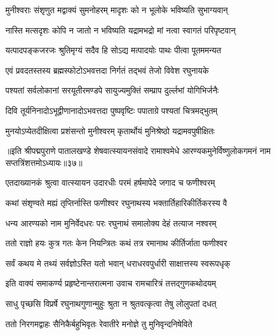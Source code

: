 \twolineshloka
{मुनीश्वराः संशृणुत मद्वाक्यं सुमनोहरम्}
{मादृशः को न भूलोके भविष्यति सुभाग्यवान्}%

\twolineshloka
{नास्ति मत्सदृशः कोपि न जातो न भविष्यति}
{यद्रामभद्रो मां नत्वा स्वागतं परिपृष्टवान्}%

\twolineshloka
{यत्पादपङ्कजरजः श्रुतिमृग्यं सदैव हि}
{सोऽद्य मत्पादयोः पाथः पीत्वा पूतममन्यत}%

\twolineshloka
{एवं प्रवदतस्तस्य ब्रह्मस्फोटोऽभवत्तदा}
{निर्गतं तद्भवं तेजो विवेश रघुनायके}%

\twolineshloka
{पश्यतां सर्वलोकानां सरयूतीरमण्डपे}
{सायुज्यमुक्तिं सम्प्राप दुर्ल्लभां योगिभिर्जनैः}%

\twolineshloka
{दिवि तूर्यनिनादोऽभूद्वीणानादोऽभवत्तदा}
{पुष्पवृष्टिः पपाताग्रे पश्यतां चित्रमद्भुतम्}%

\twolineshloka
{मुनयोऽप्येतदीक्षित्वा प्रशंसन्तो मुनीश्वरम्}
{कृतार्थोयं मुनिश्रेष्ठो यद्रामवपुषीक्षितः}%

{॥इति श्रीपद्मपुराणे पातालखण्डे शेषवात्स्यायनसंवादे रामाश्वमेधे आरण्यकमुनेर्विष्णुलोकगमनं नाम सप्तत्रिंशत्तमोऽध्यायः॥३७॥}



\twolineshloka
{एतदाख्यानकं श्रुत्वा वात्स्यायन उदारधीः}
{परमं हर्षमापेदे जगाद च फणीश्वरम्}%


\twolineshloka
{कथां संशृण्वते मह्यं तृप्तिर्नास्ति फणीश्वर}
{रघुनाथस्य भक्तार्तिहारिकीर्तिकरस्य वै}%

\twolineshloka
{धन्य आरण्यको नाम मुनिर्वेदधरः परः}
{रघुनाथं समालोक्य देहं तत्याज नश्वरम्}%

\twolineshloka
{ततो राज्ञो हयः कुत्र गतः केन नियन्त्रितः}
{कथं तत्र रमानाथ कीर्तिर्जाता फणीश्वर}%

\twolineshloka
{सर्वं कथय मे तथ्यं सर्वज्ञोऽस्ति यतो भवान्}
{धराधरवपुर्धारी साक्षात्तस्य स्वरूपधृक्}%


\twolineshloka
{इति वाक्यं समाकर्ण्य प्रहृष्टेनान्तरात्मना}
{उवाच रामचारित्रं तत्तद्गुणकथोदयम्}%


\twolineshloka
{साधु पृच्छसि विप्रर्षे रघुनाथगुणान्मुहुः}
{श्रुता न श्रुतवत्कृत्वा तेषु लोलुपतां दधत्}%

\twolineshloka
{ततो निरगमद्वाहः सैनिकैर्बहुभिवृतः}
{रेवातीरे मनोज्ञे तु मुनिवृन्दनिषेविते}%

